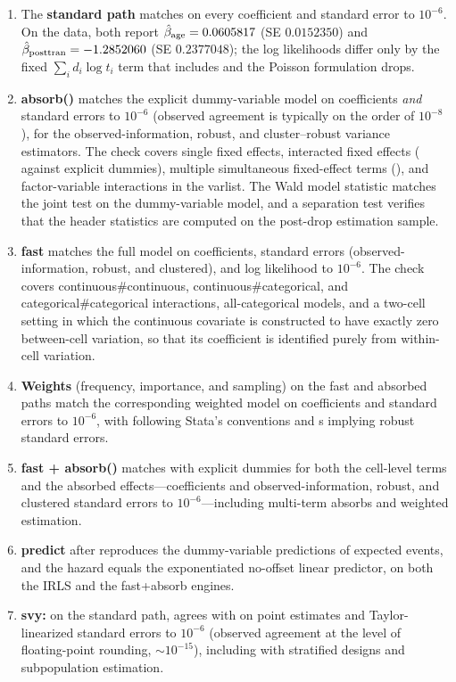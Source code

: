 \documentclass[12pt,a4paper]{article}
\begin{document}
\begin{enumerate}
\item The \textbf{standard path} matches  on every coefficient and standard error to $10^{-6}$.  On the  data, both report $\hat{\beta}_{\rm age} = 0.0605817$ (SE $0.0152350$) and $\hat{\beta}_{\rm posttran} = -1.2852060$ (SE $0.2377048$); the log likelihoods differ only by the fixed $\sum_i d_i \log t_i$ term that  includes and the Poisson formulation drops.
\item \sloppy \textbf{absorb()} matches the explicit dummy-variable  model on coefficients \emph{and} standard errors to $10^{-6}$ (observed agreement is typically on the order of $10^{-8}$), for the observed-information, robust, and cluster--robust variance estimators.  The check covers single fixed effects, interacted fixed effects ( against explicit  dummies), multiple simultaneous fixed-effect terms (), and factor-variable interactions in the varlist.  The Wald model statistic matches the joint test on the dummy-variable model, and a separation test verifies that the header statistics are computed on the post-drop estimation sample.
\item \textbf{fast} matches the full  model on coefficients, standard errors (observed-information, robust, and clustered), and log likelihood to $10^{-6}$.  The check covers continuous\#continuous, continuous\#categorical, and categorical\#categorical interactions, all-categorical models, and a two-cell setting in which the continuous covariate is constructed to have exactly zero between-cell variation, so that its coefficient is identified purely from within-cell variation.
\item \textbf{Weights} (frequency, importance, and sampling) on the fast and absorbed paths match the corresponding weighted  model on coefficients and standard errors to $10^{-6}$, with  following Stata's conventions and s implying robust standard errors.
\item \textbf{fast + absorb()} matches  with explicit dummies for both the cell-level terms and the absorbed effects---coefficients and observed-information, robust, and clustered standard errors to $10^{-6}$---including multi-term absorbs and weighted estimation.
\item \textbf{predict} after  reproduces the dummy-variable  predictions of expected events, and the hazard equals the exponentiated no-offset linear predictor, on both the IRLS and the fast+absorb engines.
\item \textbf{svy:} on the standard path,  agrees with  on point estimates and Taylor-linearized standard errors to $10^{-6}$ (observed agreement at the level of floating-point rounding, $\sim 10^{-15}$), including with stratified designs and subpopulation estimation.
\end{enumerate}
\end{document}
